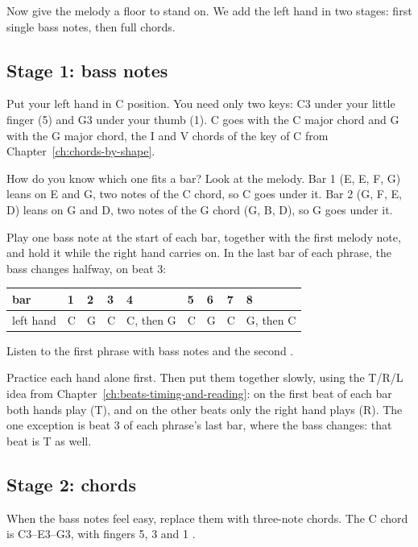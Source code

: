 Now give the melody a floor to stand on. We add the left hand in two stages: first single bass notes, then full chords.

\subsection*{Stage 1: bass notes}

Put your left hand in C position. You need only two keys: C3 under your little finger (5) and G3 under your thumb (1). C goes with the C major chord and G with the G major chord, the I and V chords of the key of C from Chapter~\ref{ch:chords-by-shape}.

How do you know which one fits a bar? Look at the melody. Bar 1 (E, E, F, G) leans on E and G, two notes of the C chord, so C goes under it. Bar 2 (G, F, E, D) leans on G and D, two notes of the G chord (G, B, D), so G goes under it.

Play one bass note at the start of each bar, together with the first melody note, and hold it while the right hand carries on. In the last bar of each phrase, the bass changes halfway, on beat 3:

\begin{center}
\begin{tabular}{lllllllll}
\toprule
bar & 1 & 2 & 3 & 4 & 5 & 6 & 7 & 8 \\
\midrule
left hand & C & G & C & C, then G & C & G & C & G, then C \\
\bottomrule
\end{tabular}
\end{center}

Listen to the first phrase with bass notes  and the second .

Practice each hand alone first. Then put them together slowly, using the T/R/L idea from Chapter~\ref{ch:beats-timing-and-reading}: on the first beat of each bar both hands play (T), and on the other beats only the right hand plays (R). The one exception is beat 3 of each phrase's last bar, where the bass changes: that beat is T as well.

\subsection*{Stage 2: chords}

When the bass notes feel easy, replace them with three-note chords. The C chord is C3--E3--G3, with fingers 5, 3 and 1 .

